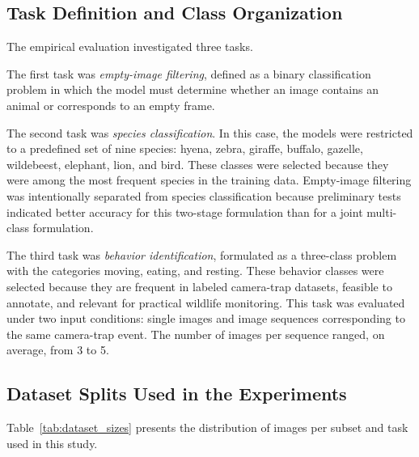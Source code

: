 \subsection{Task Definition and Class Organization}

The empirical evaluation investigated three tasks.

The first task was \textit{empty-image filtering}, defined as a binary classification problem in which the model must determine whether an image contains an animal or corresponds to an empty frame.

The second task was \textit{species classification}. In this case, the models were restricted to a predefined set of nine species: hyena, zebra, giraffe, buffalo, gazelle, wildebeest, elephant, lion, and bird. These classes were selected because they were among the most frequent species in the training data. Empty-image filtering was intentionally separated from species classification because preliminary tests indicated better accuracy for this two-stage formulation than for a joint multi-class formulation.

The third task was \textit{behavior identification}, formulated as a three-class problem with the categories moving, eating, and resting. These behavior classes were selected because they are frequent in labeled camera-trap datasets, feasible to annotate, and relevant for practical wildlife monitoring. This task was evaluated under two input conditions: single images and image sequences corresponding to the same camera-trap event. The number of images per sequence ranged, on average, from 3 to 5.

\subsection{Dataset Splits Used in the Experiments}

Table~\ref{tab:dataset_sizes} presents the distribution of images per subset and task used in this study.


